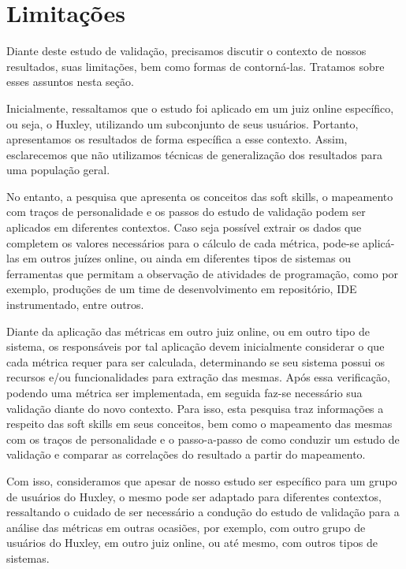 \section{Limitações}
\label{sec:limitacoes}

Diante deste estudo de validação, precisamos discutir o contexto de nossos resultados, suas limitações, bem como formas de contorná-las. Tratamos sobre esses assuntos nesta seção.

Inicialmente, ressaltamos que o estudo foi aplicado em um juiz online específico, ou seja, o Huxley, utilizando um subconjunto de seus usuários. Portanto, apresentamos os resultados de forma específica a esse contexto. Assim, esclarecemos que não utilizamos técnicas de generalização dos resultados para uma população geral. %

No entanto, a pesquisa que apresenta os conceitos das soft skills, o mapeamento com traços de personalidade e os passos do estudo de validação podem ser aplicados em diferentes contextos.
Caso seja possível extrair os dados que completem os valores necessários para o cálculo de cada métrica, pode-se aplicá-las em outros juízes online, ou ainda em diferentes tipos de sistemas ou ferramentas que permitam a observação de atividades de programação, como por exemplo, produções de um time de desenvolvimento em repositório, IDE instrumentado, entre outros.

Diante da aplicação das métricas em outro juiz online, ou em outro tipo de sistema, os responsáveis por tal aplicação devem inicialmente considerar o que cada métrica requer para ser calculada, determinando se seu sistema possui os recursos e/ou funcionalidades para extração das mesmas. Após essa verificação, podendo uma métrica ser implementada, em seguida faz-se necessário sua validação diante do novo contexto. Para isso, esta pesquisa traz informações a respeito das soft skills em seus conceitos, bem como o mapeamento das mesmas com os traços de personalidade e o passo-a-passo de como conduzir um estudo de validação e comparar as correlações do resultado a partir do mapeamento.

Com isso, consideramos que apesar de nosso estudo ser específico para um grupo de usuários do Huxley, o mesmo pode ser adaptado para diferentes contextos, ressaltando o cuidado de ser necessário a condução do estudo de validação para a análise das métricas em outras ocasiões, por exemplo, com outro grupo de usuários do Huxley, em outro juiz online, ou até mesmo, com outros tipos de sistemas. 

